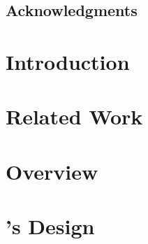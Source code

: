 \documentclass[11pt,twoside,final]{mitthesis}
\begin{document}



\maketitle

\begin{abstractpage}

\end{abstractpage}
\cleardoublepage

\section*{Acknowledgments}
  
\cleardoublepage


\tableofcontents
\clearpage
\listoffigures
\clearpage

\listoftodos


\chapter{Introduction}%
\label{ch:introduction}


\chapter{Related Work}%
\label{ch:related}


\chapter{Overview}%
\label{ch:overview}


\chapter{\sys's Design}%
\label{ch:design}

\end{document}
